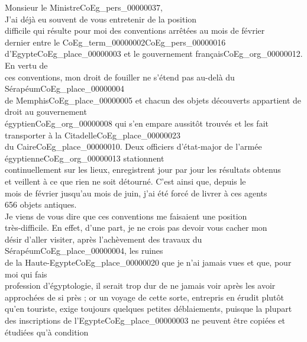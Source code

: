 \documentclass{book}
\begin{document}
\hspace{1cm}Monsieur le Ministre\gls{CoEg_pers_00000037},\\

\indent J’ai déjà eu souvent de vous entretenir de la position\\
difficile qui résulte pour moi des conventions arrêtées au mois de février\\
dernier entre le \gls{CoEg_term_00000002}\gls{CoEg_pers_00000016} d’Egypte\gls{CoEg_place_00000003} et le gouvernement français\gls{CoEg_org_00000012}. En vertu de\\
ces conventions, mon droit de fouiller ne s’étend pas au-delà du Sérapéum\gls{CoEg_place_00000004}\\
de Memphis\gls{CoEg_place_00000005} et chacun des objets découverts appartient de droit au gouvernement\\
égyptien\gls{CoEg_org_00000008} qui s'en empare aussitôt trouvés et les fait transporter à la Citadelle\gls{CoEg_place_00000023}\\
du Caire\gls{CoEg_place_00000010}. Deux officiers d’état-major de l’armée égyptienne\gls{CoEg_org_00000013} stationnent\\
continuellement sur les lieux, enregistrent jour par jour les résultats obtenus\\
et veillent à ce que rien ne soit détourné. C’est ainsi que, depuis le\\
mois de février jusqu’au mois de juin, j’ai été forcé de livrer à ces agents\\
656 objets antiques.\\
\indent Je viens de vous dire que ces conventions me faisaient une position\\
très-difficile. En effet, d’une part, je ne crois pas devoir vous cacher mon\\
désir d’aller visiter, après l’achèvement des travaux du Sérapéum\gls{CoEg_place_00000004}, les ruines\\
de la Haute-Egypte\gls{CoEg_place_00000020} que je n’ai jamais vues et que, pour moi qui fais\\
profession d’égyptologie, il serait trop dur de ne jamais voir après les avoir\\
approchées de si près ; or un voyage de cette sorte, entrepris en érudit plutôt\\
qu’en touriste, exige toujours quelques petites déblaiements, puisque la plupart\\
des inscriptions de l’Egypte\gls{CoEg_place_00000003} ne peuvent être copiées et étudiées qu’à condition\\
\end{document}
